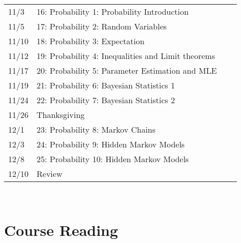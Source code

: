 \documentclass[11pt]{article}
\begin{document}
\begin{centering}
\begin{tabular}{||l|p{3in}|l|l||}
11/3 & 16:  Probability 1: Probability Introduction  &   &   \\ 
11/5 & 17: Probability 2: Random Variables   &  &  \\ 
\hline

11/10 & 18: Probability 3: Expectation &   & \\  
11/12& 19: Probability 4:  Inequalities and Limit theorems   &  &    \\  
\hline
11/17 & 20: Probability 5: Parameter Estimation and MLE &   & \\  
11/19& 21: Probability 6: Bayesian Statistics 1   &  &   \\  
\hline
11/24 & 22: Probability 7: Bayesian Statistics 2   &   &  \\
11/26 & Thanksgiving &   &  \\  
\hline

12/1 & 23:  Probability 8: Markov Chains  &  &  \\
12/3 & 24: Probability 9: Hidden Markov Models  &   &  \\ 
\hline
12/8&  25: Probability 10: Hidden Markov Models  &  &  \\
12/10& Review &  &  \\

\hline\hline

\end{tabular}\\
\end{centering}

\section*{Course Reading}
\end{document}
